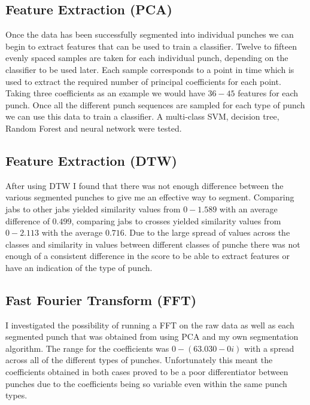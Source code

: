 \subsection{Feature Extraction (PCA)}
Once the data has been successfully segmented into individual punches we can begin to extract features that can be used to train a classifier. Twelve to fifteen evenly spaced samples are taken for each individual punch, depending on the classifier to be used later. Each sample corresponds to a point in time which is used to extract the required number of principal coefficients for each point. Taking three coefficients as an example we would have $36 - 45$ features for each punch.
Once all the different punch sequences are sampled for each type of punch we can use this data to train a classifier. A multi-class SVM, decision tree, Random Forest and neural network were tested.

\subsection{Feature Extraction (DTW)}
After using DTW I found that there was not enough difference between the various segmented punches to give me an effective way to segment. Comparing jabs to other jabs yielded similarity values from $0 - 1.589$ with an average difference of $0.499$, comparing jabs to crosses yielded similarity values from $0-2.113$ with the average $0.716$. Due to the large spread of values across the classes and similarity in values between different classes of punche there was not enough of a consistent difference in the score to be able to extract features or have an indication of the type of punch.

\subsection{Fast Fourier Transform (FFT)}
 I investigated the possibility of running a FFT on the raw data as well as each segmented punch that was obtained from using PCA and my own segmentation algorithm. The range for the coefficients was $0 - (63.030 - 0i)$ with a spread across all of the different types of punches. Unfortunately this meant the coefficients obtained in both cases proved to be a poor differentiator between punches due to the coefficients being so variable even within the same punch types.

